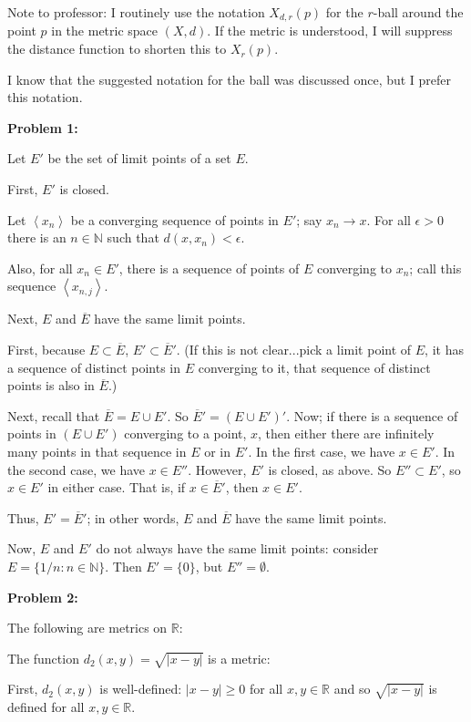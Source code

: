 \documentclass[a4paper,12pt]{article}
\newcommand{\tab}{\hspace{4mm}} %
\newcommand{\shunt}{\vspace{20mm}}
\newcommand{\absval}[1]{\lvert #1 \rvert}
\newcommand{\anbrack}[1]{\left\langle #1 \right\rangle}
\newcommand{\ep}{\epsilon}
\newcommand{\N}{\mathbb{N}}
\newcommand{\R}{\mathbb{R}}
\begin{document}
Note to professor: I routinely use the notation $X_{d,r}(p)$ for the $r$-ball around the point $p$ in the metric space $(X,d)$. If the metric is understood, I will suppress the distance function to shorten this to $X_r(p)$.

I know that the suggested notation for the ball was discussed once, but I prefer this notation.

{\bf Problem 1:}

Let $E'$ be the set of limit points of a set $E$.

First, $E'$ is closed.

\tab Let $\anbrack{x_n}$ be a converging sequence of points in $E'$; say $x_n \to x$. For all $\ep >0$ there is an $n \in \N$ such that $d(x,x_n) < \ep$.

\tab Also, for all $x_n \in E'$, there is a sequence of points of $E$ converging to $x_n$; call this sequence $\anbrack{x_{n,j}}$. 

\tab %

Next, $E$ and $\overline{E}$ have the same limit points.

\tab First, because $E \subset \overline{E}$, $E' \subset \overline{E}'$. (If this is not clear...pick a limit point of $E$, it has a sequence of distinct points in $E$ converging to it, that sequence of distinct points is also in $\overline{E}$.)

\tab Next, recall that $\overline{E} = E \cup E'$. So $\overline{E}' = (E \cup E')'$. Now; if there is a sequence of points in $(E \cup E')$ converging to a point, $x$, then either there are infinitely many points in that sequence in $E$ or in $E'$. In the first case, we have $x \in E'$. In the second case, we have $x \in E''$. However, $E'$ is closed, as above. So $E'' \subset E'$, so $x \in E'$ in either case. That is, if $x \in \overline{E}'$, then $x \in E'$.

Thus, $E' = \overline{E}'$; in other words, $E$ and $\overline{E}$ have the same limit points.

Now, $E$ and $E'$ do not always have the same limit points: consider $E = \{1/n: n \in \N\}$. Then $E' = \{0\}$, but $E'' = \emptyset$.

\shunt

{\bf Problem 2:}

The following are metrics on $\R$:

The function $d_2(x,y) = \sqrt{\absval{x-y}}$ is a metric:

\tab First, $d_2(x,y)$ is well-defined: $\absval{x-y} \geq 0$ for all $x, y \in \R$ and so $\sqrt{\absval{x-y}}$ is defined for all $x,y \in \R$.
\end{document}
